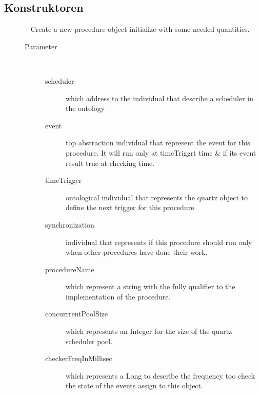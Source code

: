 \subsection{Konstruktoren}
\begin{description}
\item[{\label{ontologyFramework.OFDataMapping.ReservatedDataType.Procedure(org.semanticweb.owlapi.model.OWLNamedIndividual,org.semanticweb.owlapi.model.OWLNamedIndividual,org.semanticweb.owlapi.model.OWLNamedIndividual,org.semanticweb.owlapi.model.OWLNamedIndividual,org.semanticweb.owlapi.model.OWLLiteral,org.semanticweb.owlapi.model.OWLLiteral,org.semanticweb.owlapi.model.OWLLiteral)}}]
~ Create a new procedure object initialize with some needed quantities.
\begin{description}
\item[Parameter] ~
\begin{description}
\item[scheduler]
which address to the individual that describe a 
 scheduler in the ontology
\item[event]
top abstraction individual that represent the event for
 this procedure. It will run only at timeTriggrt time \& if its event result 
 true at checking time.
\item[timeTrigger]
ontological individual that represents the
 quartz object to define the next trigger for this procedure.
\item[synchronization]
individual that represents if this procedure should run
 only when other procedures have done their work.
\item[procedureName]
which represent a string with the fully qualifier to 
 the implementation of the procedure.
\item[concurrrentPoolSize]
which represents an Integer for the size of the quartz
 scheduler pool.
\item[checkerFreqInMillisec]
which represents a Long to describe the frequency
 too check the state of the events assign to this object.
\end{description}
\end{description}
\end{description}
